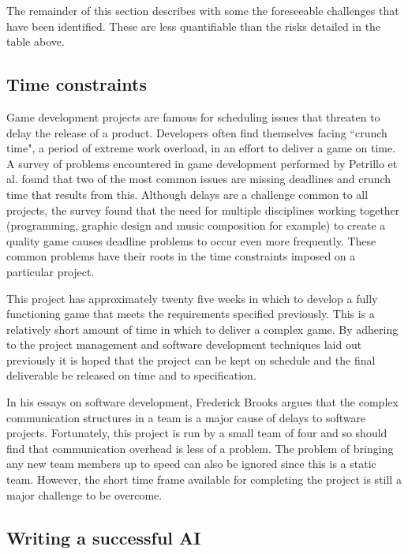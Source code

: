 The remainder of this section describes with some the foreseeable challenges that have been
identified. These are less quantifiable than the risks detailed in the table above.

\subsection{Time constraints}

Game development projects are famous for scheduling issues that threaten to delay the
release of a product. Developers often find themselves facing ``crunch time", a period
of extreme work overload, in an effort to deliver a game on time.\cite[-1em]{groen2011}
A survey of problems encountered in game development performed by Petrillo et al. found
that two of the most common issues are missing deadlines and crunch time that results 
from this.\cite[1em]{petrillo2009} Although delays are a challenge common to all projects,
the survey found that the need for multiple disciplines working together (programming,
graphic design and music composition for example) to create a quality game causes
deadline problems to occur even more frequently. These common problems have their roots
in the time constraints imposed on a particular project.

This project has approximately twenty five weeks in which to develop a fully functioning
game that meets the requirements specified previously. This is a relatively short amount
of time in which to deliver a complex game. By adhering to the project management
and software development techniques laid out previously it is hoped that the project
can be kept on schedule and the final deliverable be released on time and to specification.

In his essays on software development, Frederick Brooks argues that the complex
communication structures in a team is a major cause of delays to software projects.\cite{brooks1995}
Fortunately, this project is run by a small team of four and so should find that
communication overhead is less of a problem. The problem of bringing any new team
members up to speed can also be ignored since this is a static team.
However, the short time frame available for completing the project is still a
major challenge to be overcome.

\subsection{Writing a successful AI}

